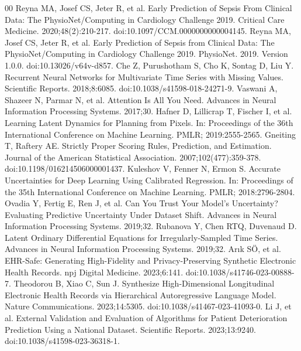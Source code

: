 \documentclass[conference]{IEEEtran}
\begin{document}
\balance
\begin{thebibliography}{00}
 Reyna MA, Josef CS, Jeter R, et al. Early Prediction of Sepsis From Clinical Data: The PhysioNet/Computing in Cardiology Challenge 2019. Critical Care Medicine. 2020;48(2):210-217. doi:10.1097/CCM.0000000000004145.
 Reyna MA, Josef CS, Jeter R, et al. Early Prediction of Sepsis from Clinical Data: The PhysioNet/Computing in Cardiology Challenge 2019. PhysioNet. 2019. Version 1.0.0. doi:10.13026/v64v-d857.
 Che Z, Purushotham S, Cho K, Sontag D, Liu Y. Recurrent Neural Networks for Multivariate Time Series with Missing Values. Scientific Reports. 2018;8:6085. doi:10.1038/s41598-018-24271-9.
 Vaswani A, Shazeer N, Parmar N, et al. Attention Is All You Need. Advances in Neural Information Processing Systems. 2017;30.
 Hafner D, Lillicrap T, Fischer I, et al. Learning Latent Dynamics for Planning from Pixels. In: Proceedings of the 36th International Conference on Machine Learning. PMLR; 2019:2555-2565.
 Gneiting T, Raftery AE. Strictly Proper Scoring Rules, Prediction, and Estimation. Journal of the American Statistical Association. 2007;102(477):359-378. doi:10.1198/016214506000001437.
 Kuleshov V, Fenner N, Ermon S. Accurate Uncertainties for Deep Learning Using Calibrated Regression. In: Proceedings of the 35th International Conference on Machine Learning. PMLR; 2018:2796-2804.
 Ovadia Y, Fertig E, Ren J, et al. Can You Trust Your Model's Uncertainty? Evaluating Predictive Uncertainty Under Dataset Shift. Advances in Neural Information Processing Systems. 2019;32.
 Rubanova Y, Chen RTQ, Duvenaud D. Latent Ordinary Differential Equations for Irregularly-Sampled Time Series. Advances in Neural Information Processing Systems. 2019;32.
 Arık SÖ, et al. EHR-Safe: Generating High-Fidelity and Privacy-Preserving Synthetic Electronic Health Records. npj Digital Medicine. 2023;6:141. doi:10.1038/s41746-023-00888-7.
 Theodorou B, Xiao C, Sun J. Synthesize High-Dimensional Longitudinal Electronic Health Records via Hierarchical Autoregressive Language Model. Nature Communications. 2023;14:5305. doi:10.1038/s41467-023-41093-0.
 Li J, et al. External Validation and Evaluation of Algorithms for Patient Deterioration Prediction Using a National Dataset. Scientific Reports. 2023;13:9240. doi:10.1038/s41598-023-36318-1.
\end{thebibliography}
\end{document}
